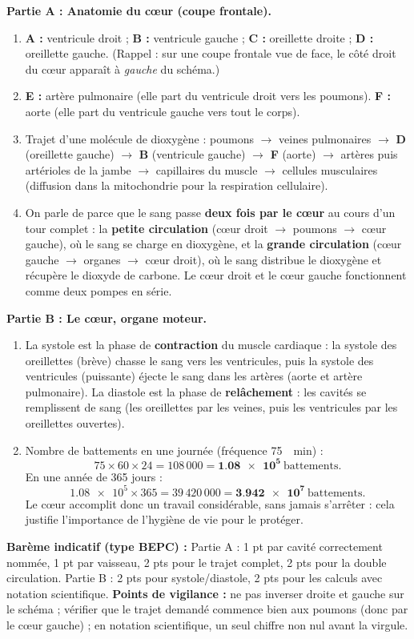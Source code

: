 \documentclass[11pt]{article}
\newcommand{\cle}[1]{{\popxbold\color{popdark}#1}}
\begin{document}
\begin{corrige}
\textbf{Partie A : Anatomie du cœur (coupe frontale).}
\begin{enumerate}
\item \textbf{A :} ventricule droit ; \textbf{B :} ventricule gauche ; \textbf{C :} oreillette droite ; \textbf{D :} oreillette gauche. (Rappel : sur une coupe frontale vue de face, le côté droit du cœur apparaît à \emph{gauche} du schéma.)
\item \textbf{E :} artère pulmonaire (elle part du ventricule droit vers les poumons). \textbf{F :} aorte (elle part du ventricule gauche vers tout le corps).
\item Trajet d'une molécule de dioxygène : poumons $\to$ veines pulmonaires $\to$ \textbf{D} (oreillette gauche) $\to$ \textbf{B} (ventricule gauche) $\to$ \textbf{F} (aorte) $\to$ artères puis artérioles de la jambe $\to$ capillaires du muscle $\to$ cellules musculaires (diffusion dans la mitochondrie pour la respiration cellulaire).
\item On parle de \og \cle{double circulation} \fg{} parce que le sang passe \textbf{deux fois par le cœur} au cours d'un tour complet : la \textbf{petite circulation} (cœur droit $\to$ poumons $\to$ cœur gauche), où le sang se charge en dioxygène, et la \textbf{grande circulation} (cœur gauche $\to$ organes $\to$ cœur droit), où le sang distribue le dioxygène et récupère le dioxyde de carbone. Le cœur droit et le cœur gauche fonctionnent comme deux pompes en série.
\end{enumerate}
\textbf{Partie B : Le cœur, organe moteur.}
\begin{enumerate}[resume]
\item La \cle{systole} est la phase de \textbf{contraction} du muscle cardiaque : la systole des oreillettes (brève) chasse le sang vers les ventricules, puis la systole des ventricules (puissante) éjecte le sang dans les artères (aorte et artère pulmonaire). La \cle{diastole} est la phase de \textbf{relâchement} : les cavités se remplissent de sang (les oreillettes par les veines, puis les ventricules par les oreillettes ouvertes).
\item Nombre de battements en une journée (fréquence \SI{75}{\per\minute}) :
\[ 75 \times 60 \times 24 = 108\,000 = \mathbf{\num{1,08e5}} \ \text{battements}. \]
En une année de 365 jours :
\[ \num{1,08e5} \times 365 = 39\,420\,000 = \mathbf{\num{3,942e7}} \ \text{battements}. \]
Le cœur accomplit donc un travail considérable, sans jamais s'arrêter : cela justifie l'importance de l'hygiène de vie pour le protéger.
\end{enumerate}
\textbf{Barème indicatif (type BEPC) :} Partie A : 1 pt par cavité correctement nommée, 1 pt par vaisseau, 2 pts pour le trajet complet, 2 pts pour la double circulation. Partie B : 2 pts pour systole/diastole, 2 pts pour les calculs avec notation scientifique.
\textbf{Points de vigilance :} ne pas inverser droite et gauche sur le schéma ; vérifier que le trajet demandé commence bien aux poumons (donc par le cœur gauche) ; en notation scientifique, un seul chiffre non nul avant la virgule.
\end{corrige}
\end{document}
